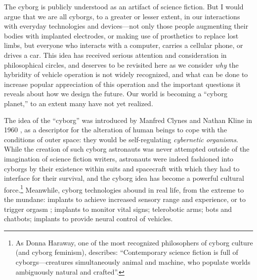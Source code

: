 The cyborg is publicly understood as an artifact of science
fiction. But I would argue that we are
all cyborgs, to a greater or lesser extent, in our interactions with
everyday technologies and devices---not only those people augmenting
their bodies with implanted electrodes, or making use of prosthetics
to replace lost limbs, but everyone who interacts with a computer,
carries a cellular phone, or drives a car. This idea has received
serious attention and consideration in philosophical circles, and
deserves to be revisited here as we consider \emph{why} the hybridity
of vehicle operation is not widely recognized, and what can be done to
increase popular appreciation of this operation and the important
questions it reveals about how we design the future. Our world is
becoming a ``cyborg planet,'' to an extent many have not yet
realized\cite[p. 64]{ekbia}.

The idea of the ``cyborg'' was introduced by Manfred Clynes and Nathan
Kline in 1960 \cite{???-clyneskline-intoread}, as a descriptor for the alteration of human beings to
cope with the conditions of outer space: they would be self-regulating
\emph{cybernetic organisms}\cite[p. 66]{ekbia}. While the creation of
such cyborg astronauts was never attempted outside of the imagination
of science fiction writers, astronauts were indeed fashioned into
cyborgs by their existence within suits and spacecraft with which they
had to interface for their survival, and the cyborg idea has become a
powerful cultural force.\footnote{As Donna Haraway, one of the most recognized
philosophers of cyborg culture (and cyborg feminism), describes:
``Contemporary science 
fiction is full of cyborgs---creatures simultaneously
animal and machine, who populate worlds ambiguously natural and
crafted''\cite[p. 117]{???-haraway}.} Meanwhile, cyborg technologies
abound in real life, from the extreme to the mundane: implants to
achieve increased sensory range and experience, or to trigger orgasm
\cite[p. 64]{ekbia}; implants to monitor vital signs; telerobotic
arms; bots and chatbots; implants to provide neural control of
vehicles\cite[p. 65]{ekbia}. 


